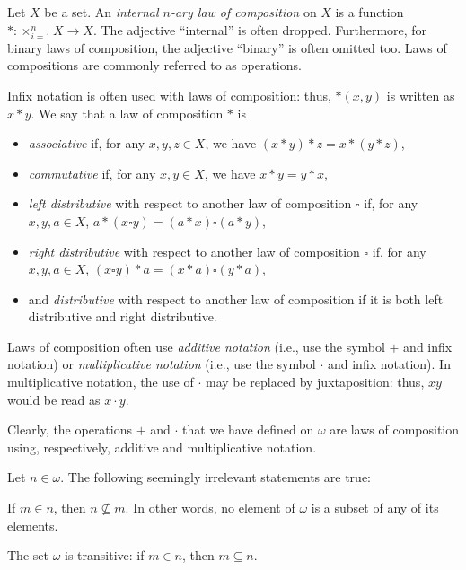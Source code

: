 \begin{definition}
Let $X$ be a set. An \emph{internal $n$-ary law of composition} on $X$ is a function $*:\times_{i=1}^n X \longrightarrow X$. The adjective ``internal'' is often dropped. Furthermore, for binary laws of composition, the adjective ``binary'' is often omitted too.
Laws of compositions are commonly referred to as operations.

Infix notation is often used with laws of composition: thus, $*(x,y)$ is written as $x * y$. We say that a law of composition $*$ is
\begin{itemize}
\item \emph{associative} if, for any $x,y,z\in X$, we have $(x*y)*z = x * (y * z)$,
\item \emph{commutative} if, for any $x,y \in X$, we have $x * y = y * x$,
\item \emph{left distributive} with respect to another law of composition $\square$ if, for any $x,y,a\in X$, $a * (x \square y) = (a * x) \square (a * y)$,
\item \emph{right distributive} with respect to another law of composition $\square$ if, for any $x,y,a\in X$, $ (x \square y) * a = (x * a) \square (y * a)$,
\item and \emph{distributive} with respect to another law of composition if it is both left distributive and right distributive.
\end{itemize}
Laws of composition often use \emph{additive notation} (i.e., use the symbol $+$ and infix notation) or \emph{multiplicative notation} (i.e., use the symbol $\cdot$ and infix notation). In multiplicative notation, the use of $\cdot$ may be replaced by juxtaposition: thus, $xy$ would be read as $x\cdot y$.

Clearly, the operations $+$ and $\cdot$ that we have defined on $\omega$ are laws of composition using, respectively, additive and multiplicative notation.
\label{<+label+>}
\end{definition}

\begin{lemma}
Let $n\in \omega$. The following seemingly irrelevant statements are true:
\begin{statements}
\item \label{wsubse} If $m\in n$, then $n\not\subseteq m$. In other words, no element of $\omega$ is a subset of any of its elements.
\item \label{wtrans} The set $\omega$ is transitive: if $m\in n$, then $m\subseteq n$.
\end{statements}
\label{lemmapeano}
\end{lemma}

